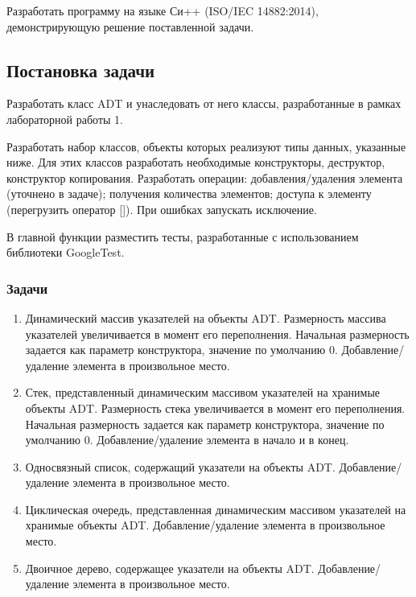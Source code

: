 \documentclass[a4paper,12pt]{article}
\begin{document}
Разработать программу на языке Си++ (ISO/IEC 14882:2014), демонстрирующую решение поставленной задачи.

\subsection*{Постановка задачи}

Разработать класс ADT и унаследовать от него классы, разработанные в рамках лабораторной работы 1.

Разработать набор классов, объекты которых реализуют типы данных, указанные ниже.
Для этих классов разработать необходимые конструкторы, деструктор, конструктор копирования.
Разработать операции: добавления/удаления элемента (уточнено в задаче); получения количества элементов; доступа к элементу (перегрузить оператор []).
При ошибках запускать исключение.

В главной функции разместить тесты, разработанные с использованием библиотеки GoogleTest.

\subsubsection*{Задачи}

\begin{enumerate}
	
\item
Динамический массив указателей на объекты ADT.
Размерность массива указателей увеличивается в момент его переполнения.
Начальная размерность задается как параметр конструктора, значение по умолчанию 0.
Добавление/удаление элемента в произвольное место.

\item
Стек, представленный динамическим массивом указателей на хранимые объекты ADT.
Размерность стека увеличивается в момент его переполнения.
Начальная размерность задается как параметр конструктора, значение по умолчанию 0.
Добавление/удаление элемента в начало и в конец.

\item
Односвязный список, содержащий указатели на объекты ADT.
Добавление/удаление элемента в произвольное место.

\item
Циклическая очередь, представленная динамическим массивом указателей на хранимые объекты ADT.
Добавление/удаление элемента в произвольное место.

\item
Двоичное дерево, содержащее указатели на объекты ADT.
Добавление/удаление элемента в произвольное место.

\end{enumerate}
\end{document}

